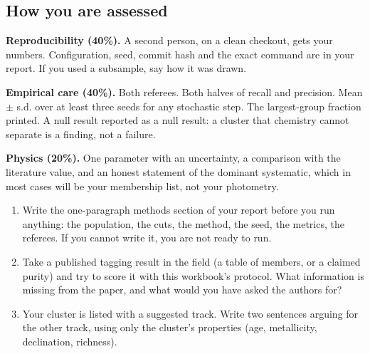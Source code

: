 \subsection{How you are assessed}

\begin{issues}
\textbf{Reproducibility (40\%).} A second person, on a clean checkout, gets
your numbers. Configuration, seed, commit hash and the exact command are in
your report. If you used a subsample, say how it was drawn.

\textbf{Empirical care (40\%).} Both referees. Both halves of recall and
precision. Mean $\pm$ s.d. over at least three seeds for any stochastic step.
The largest-group fraction printed. A null result reported as a null result: a
cluster that chemistry cannot separate is a finding, not a failure.

\textbf{Physics (20\%).} One parameter with an uncertainty, a comparison with
the literature value, and an honest statement of the dominant systematic, which
in most cases will be your membership list, not your photometry.
\end{issues}

\begin{issues}[EXERCISES]
\begin{enumerate}
\item Write the one-paragraph methods section of your report before you run
  anything: the population, the cuts, the method, the seed, the metrics, the
  referees. If you cannot write it, you are not ready to run.
\item Take a published tagging result in the field (a table of members, or a
claimed purity) and try to score it with this workbook's protocol. What
information is missing from the paper, and what would you have asked the
authors for?
\item Your cluster is listed with a suggested track. Write two sentences
  arguing for the other track, using only the cluster's properties (age,
  metallicity, declination, richness).
\end{enumerate}
\end{issues}
